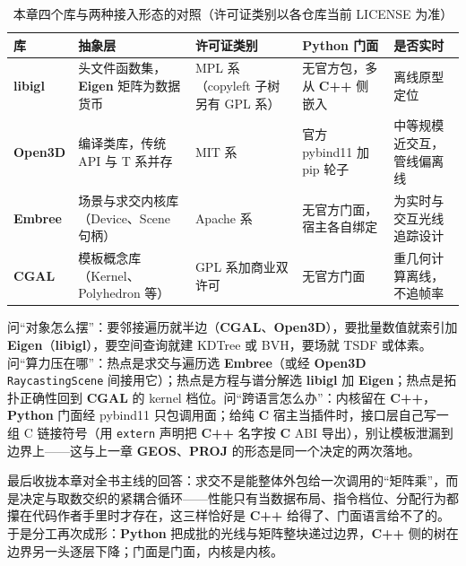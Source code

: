 \documentclass[12pt,a4paper,fontset=fandol]{ctexbook}
\newcommand{\Tp}[1]{\texttt{#1}}
\newcommand{\Lib}[1]{\textbf{#1}}
\newcommand{\Lang}[1]{\textsf{\bfseries #1}}
\newcommand{\CL}{\Lang{C}}
\newcommand{\CPP}{\Lang{C++}}
\newcommand{\PY}{\Lang{Python}}
\begin{document}
\begin{table}[H]
\centering
\caption{本章四个库与两种接入形态的对照（许可证类别以各仓库当前 LICENSE 为准）}
\label{tab:ch09-libs}
\small
\begin{tabular}{@{}>{\raggedright\arraybackslash}p{}
  >{\raggedright\arraybackslash}p{}
  >{\raggedright\arraybackslash}p{}
  >{\raggedright\arraybackslash}p{}
  >{\raggedright\arraybackslash}p{}@{}}
\toprule
库 & 抽象层 & 许可证类别 & \PY{} 门面 & 是否实时 \\
\midrule
\Lib{libigl} & 头文件函数集，\Lib{Eigen} 矩阵为数据货币 &
  MPL 系（copyleft 子树另有 GPL 系） &
  无官方包，多从 \CPP{} 侧嵌入 & 离线原型定位 \\
\Lib{Open3D} & 编译类库，传统 API 与 T 系并存 &
  MIT 系 & 官方 pybind11 加 pip 轮子 &
  中等规模近交互，管线偏离线 \\
\Lib{Embree} & 场景与求交内核库（Device、Scene 句柄） &
  Apache 系 & 无官方门面，宿主各自绑定 &
  为实时与交互光线追踪设计 \\
\Lib{CGAL} & 模板概念库（Kernel、Polyhedron 等） &
  GPL 系加商业双许可 & 无官方门面 &
  重几何计算离线，不追帧率 \\
\bottomrule
\end{tabular}
\end{table}

\begin{bestpractice}[title={用三个提问定位一个几何库}]
问``对象怎么摆''：要邻接遍历就半边（\Lib{CGAL}、\Lib{Open3D}），要批量数值就索引加 \Lib{Eigen}（\Lib{libigl}），要空间查询就建 KDTree 或 BVH，要场就 TSDF 或体素。问``算力压在哪''：热点是求交与遍历选 \Lib{Embree}（或经 \Lib{Open3D} \Tp{RaycastingScene} 间接用它）；热点是方程与谱分解选 \Lib{libigl} 加 \Lib{Eigen}；热点是拓扑正确性回到 \Lib{CGAL} 的 kernel 档位。问``跨语言怎么办''：内核留在 \CPP{}，\PY{} 门面经 pybind11 只包调用面；给纯 \CL{} 宿主当插件时，接口层自己写一组 C 链接符号（用 \Tp{extern} 声明把 \CPP{} 名字按 \CL{} ABI 导出），别让模板泄漏到边界上——这与上一章 \Lib{GEOS}、\Lib{PROJ} 的形态是同一个决定的两次落地。
\end{bestpractice}

最后收拢本章对全书主线的回答：求交不是能整体外包给一次调用的``矩阵乘''，而是决定与取数交织的紧耦合循环——性能只有当数据布局、指令档位、分配行为都攥在代码作者手里时才存在，这三样恰好是 \CPP{} 给得了、门面语言给不了的。于是分工再次成形：\PY{} 把成批的光线与矩阵整块递过边界，\CPP{} 侧的树在边界另一头逐层下降；门面是门面，内核是内核。
\end{document}
